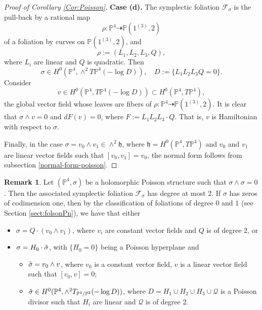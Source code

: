 \documentclass[twoside]{amsart}
\numberwithin{equation}{section}
\def\PP{{\mathbb{P}}}
\newcommand{\sF}{\mathscr{F}}
\theoremstyle{definition}
\newtheorem{remark}{Remark}[section]
\begin{document}
\begin{proof}[Proof of Corollary \ref{Cor:Poisson}]
\medskip 
\noindent\textbf{Case (d).}
The symplectic foliation $\sF_\sigma$ is the pull-back by a rational map
\[
\rho\colon \PP^{4} \dashrightarrow \mathbb{P}(1^{(3)}, 2)
\]
of a foliation by curves on $\mathbb{P}(1^{(3)}, 2)$, and
\[
\rho := (L_1, L_2, L_3, Q),
\]
where $L_i$ are linear and $Q$ is quadratic. Then
\[
\sigma \in H^0(\PP^{4}, \wedge^2T\PP^{4}(-\log D)),
\quad
D := \{L_1 L_2 L_3 Q = 0\}.
\]
Consider
\[
v \in H^0(\PP^{4}, T\PP^{4}(-\log D)) \subset H^0(\PP^{4},T\PP^{4}),
\]
the global vector field whose leaves are fibers of
$\rho\colon \PP^{4} \dashrightarrow \mathbb{P}(1^{(3)}, 2)$. It is clear that
$\sigma \wedge v = 0$ and $dF(v) = 0$, where $F := L_1 L_2 L_3 \cdot Q$. That is,
$v$ is Hamiltonian with respect to $\sigma$.


Finally, in the case $\sigma = v_0 \wedge v_1 \in \wedge^2 \mathfrak{h}$, where
$\mathfrak{h} = H^0(\PP^{4}, T\PP^{4})$ and $v_0$ and $v_1$ are linear
vector fields such that $[v_0,v_1]=v_0$, the normal form follows from subsection 
 \ref{normal-form-poisson}. 
\end{proof}

\begin{remark}
 Let $(\PP^{4}, \sigma)$ be a holomorphic Poisson structure such that
 $\sigma \wedge \sigma = 0$. Then the associated symplectic foliation $\sF_\sigma$
 has degree at most $2$. If $\sigma$ has zeros of codimension one, then by the
 classification of foliations of degree $0$ and $1$ (see Section \ref{sect:folsonPn}),
 we have that either
 \begin{itemize}
   \item $\sigma = Q \cdot (v_0 \wedge v_1)$, where $v_i$ are constant vector fields
   and $Q$ is of degree $2$, or
   \item $\sigma = H_0 \cdot \Tilde{\sigma}$, with $\{H_0=0\}$ being a Poisson
   hyperplane and
   \begin{itemize}
     \item $\Tilde{\sigma} = v_0 \wedge v$, where $v_0$ is a constant vector field,
     $v$ is a linear vector field such that $[v_0, v] = 0$; 
     \item $\Tilde{\sigma} \in H^0(\PP^{4}, \wedge^2 T_{\PP^{4}/\PP^{2}}(-\log D))$,
     where $D = H_1 \cup H_2 \cup H_3 \cup \mathcal{Q}$ is a Poisson divisor such
     that $H_i$ are linear and $\mathcal{Q}$ is of degree $2$. 
   \end{itemize}
 \end{itemize}
\end{remark}
 




 
 



\end{document}

